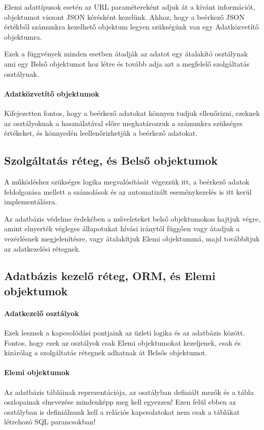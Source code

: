 Elemi adattípusok esetén az URL paramétereként adjuk át a kívánt információt, objektumot viszont JSON kérésként kezelünk. Ahhoz, hogy a beérkező JSON értékből számunkra kezelhető objektum legyen szükségünk van egy Adatközvetítő objektumra. 

Ezek a függvények minden esetben átadják az adatot egy átalakító osztálynak ami egy Belső objektumot hoz létre és tovább adja azt a megfelelő szolgáltatás osztálynak.
\paragraph{Adatközvetítő objektumok}
Kifejezetten fontos, hogy a beérkező adatokat könnyen tudjuk ellenőrizni, ezeknek az osztályoknak a használatával előre meghatározzuk a számunkra szükséges értékeket, és könnyedén leellenőrizhetjük a beérkező adatokat.

\subsection{Szolgáltatás réteg, és Belső objektumok}

A működéshez szükséges logika megvalósítását végezzük itt, a beérkező adatok feldolgozása mellett a számolások és az automatizált eseménykezelés is itt kerül implementálásra.

Az adatbázis védelme érdekében a műveleteket belső objektumokon hajtjuk végre, amint elnyerték végleges állapotukat hívási iránytól függően vagy átadjuk a vezérlésnek megjelenítésre, vagy átalakítjuk Elemi objektummá, majd továbbítjuk az adatkezelési rétegnek. 

\subsection{Adatbázis kezelő réteg, ORM, és Elemi objektumok}

\paragraph{Adatkezelő osztályok}
Ezek lesznek a kapcsolódási pontjaink az üzleti logika és az adatbázis között. Fontos, hogy ezek az osztályok csak Elemi objektumokat kezeljenek, csak és kizárólag a szolgáltatás rétegnek adhatnak át Belsős objektumot.

\paragraph{Elemi objektumok}
Az adatbázis tábláinak reprezentációja, az osztályban definiált mezők és a tábla oszlopainak elnevezése mindenképp meg kell egyezzen! Ezen felül ebben az osztályban is definiálnunk kell a relációs kapcsolatokat nem csak a táblákat létrehozó SQL parancsokban!

